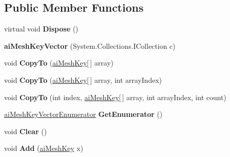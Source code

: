 \subsection*{Public Member Functions}
\begin{DoxyCompactItemize}
\item 
\hypertarget{classai_mesh_key_vector_adcf2d8fdad3c7d2df71e9e51d8311a39}{virtual void {\bfseries Dispose} ()}\label{classai_mesh_key_vector_adcf2d8fdad3c7d2df71e9e51d8311a39}

\item 
\hypertarget{classai_mesh_key_vector_a47dd2d42c4651825b78f26732af13f51}{{\bfseries ai\+Mesh\+Key\+Vector} (System.\+Collections.\+I\+Collection c)}\label{classai_mesh_key_vector_a47dd2d42c4651825b78f26732af13f51}

\item 
\hypertarget{classai_mesh_key_vector_afefac49608fd92df5157ef09a5a01d75}{void {\bfseries Copy\+To} (\hyperlink{structai_mesh_key}{ai\+Mesh\+Key}\mbox{[}$\,$\mbox{]} array)}\label{classai_mesh_key_vector_afefac49608fd92df5157ef09a5a01d75}

\item 
\hypertarget{classai_mesh_key_vector_a259f2feacf1341f0ded22ad157e8cb24}{void {\bfseries Copy\+To} (\hyperlink{structai_mesh_key}{ai\+Mesh\+Key}\mbox{[}$\,$\mbox{]} array, int array\+Index)}\label{classai_mesh_key_vector_a259f2feacf1341f0ded22ad157e8cb24}

\item 
\hypertarget{classai_mesh_key_vector_a3875f5ff03f2e6032a242bdc9bd2dd0d}{void {\bfseries Copy\+To} (int index, \hyperlink{structai_mesh_key}{ai\+Mesh\+Key}\mbox{[}$\,$\mbox{]} array, int array\+Index, int count)}\label{classai_mesh_key_vector_a3875f5ff03f2e6032a242bdc9bd2dd0d}

\item 
\hypertarget{classai_mesh_key_vector_a57ae38ed167ba02b2414aced293a6ea1}{\hyperlink{classai_mesh_key_vector_1_1ai_mesh_key_vector_enumerator}{ai\+Mesh\+Key\+Vector\+Enumerator} {\bfseries Get\+Enumerator} ()}\label{classai_mesh_key_vector_a57ae38ed167ba02b2414aced293a6ea1}

\item 
\hypertarget{classai_mesh_key_vector_ac83661a689f7bfcb533adb9857882deb}{void {\bfseries Clear} ()}\label{classai_mesh_key_vector_ac83661a689f7bfcb533adb9857882deb}

\item 
\hypertarget{classai_mesh_key_vector_ae1177559b7c5c13c1a89b6cf8c33d15e}{void {\bfseries Add} (\hyperlink{structai_mesh_key}{ai\+Mesh\+Key} x)}\label{classai_mesh_key_vector_ae1177559b7c5c13c1a89b6cf8c33d15e}


\end{DoxyCompactItemize}
